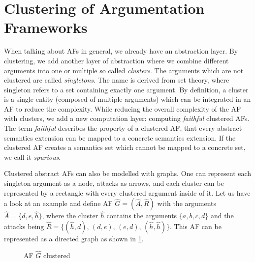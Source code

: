 \section{Clustering of Argumentation Frameworks}
\label{sec:ClusteringOfArgumentationFrameworks}

When talking about AFs in general, we already have an abstraction layer. By clustering, we add another layer of abstraction where we combine different arguments into one or multiple so called \emph{clusters}. The arguments which are not clustered are called \emph{singletons}. The name is derived from set theory, where singleton refers to a set containing exactly one argument.
By definition, a cluster is a single entity (composed of multiple arguments) which can be integrated in an AF to reduce the complexity. While reducing the overall complexity of the AF with clusters, we add a new computation layer: computing \emph{faithful} clustered AFs. The term \emph{faithful} describes the property of a clustered AF, that every abstract semantics extension can be mapped to a concrete semantics extension. If the clustered AF creates a semantics set which cannot be mapped to a concrete set, we call it \emph{spurious}.

Clustered abstract AFs can also be modelled with graphs. One can represent each singleton argument as a node, attacks as arrows, and each cluster can be represented by a rectangle with every clustered argument inside of it. Let us have a look at an example and define AF $\hat{G}=(\hat{A}, \hat{R})$ with the arguments $\hat{A}=\{d, e, \hat{h}\}$, where the cluster $\hat{h}$ contains the arguments $\{a, b, c, d\}$ and the attacks being $\hat{R}=\bigl\{(\hat{h}, d)$, $(d, e)$, $(e, d)$, $(\hat{h},\hat{h})\bigl\}$.  This AF can be represented as a directed graph as shown in \cref{af:backgroundExampleClusterSpurious}.


\begin{figure}[h]
    \centering
    \caption{\ac{AF} $\hat{G}$ clustered}
    \label{af:backgroundExampleClusterSpurious}
\end{figure}


